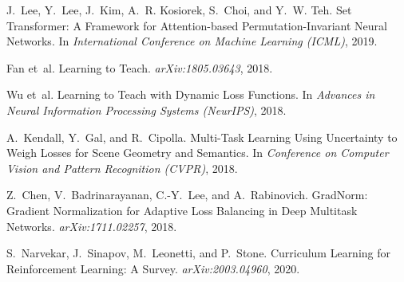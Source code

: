 \documentclass[11pt]{article}
\newcommand{\1}{\mathbf{1}}
\begin{document}
\begin{thebibliography}{30}
J.~Lee, Y.~Lee, J.~Kim, A.~R. Kosiorek, S.~Choi, and Y.~W. Teh.
\newblock Set Transformer: A Framework for Attention-based Permutation-Invariant Neural Networks.
\newblock In \emph{International Conference on Machine Learning (ICML)}, 2019.

Fan et~al.
\newblock Learning to Teach.
\newblock \emph{arXiv:1805.03643}, 2018.

Wu et~al.
\newblock Learning to Teach with Dynamic Loss Functions.
\newblock In \emph{Advances in Neural Information Processing Systems (NeurIPS)}, 2018.

A.~Kendall, Y.~Gal, and R.~Cipolla.
\newblock Multi-Task Learning Using Uncertainty to Weigh Losses for Scene Geometry and Semantics.
\newblock In \emph{Conference on Computer Vision and Pattern Recognition (CVPR)}, 2018.

Z.~Chen, V.~Badrinarayanan, C.-Y.~Lee, and A.~Rabinovich.
\newblock GradNorm: Gradient Normalization for Adaptive Loss Balancing in Deep Multitask Networks.
\newblock \emph{arXiv:1711.02257}, 2018.

S.~Narvekar, J.~Sinapov, M.~Leonetti, and P.~Stone.
\newblock Curriculum Learning for Reinforcement Learning: A Survey.
\newblock \emph{arXiv:2003.04960}, 2020.

\end{thebibliography}
\end{document}
